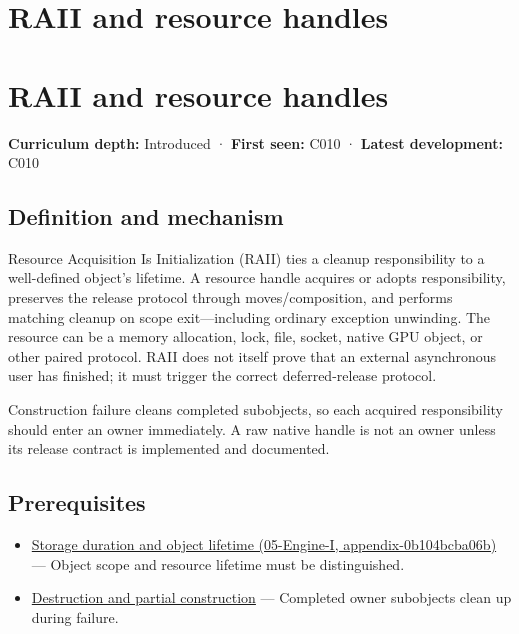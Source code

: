 \hypertarget{appendix-69739d3ab49b}{}
\section*{RAII and resource handles}
\section{RAII and resource handles}\label{appendix-69739d3ab49b-raii-and-resource-handles}

\textbf{Curriculum depth:} Introduced · \textbf{First seen:} C010 · \textbf{Latest development:} C010

\subsection{Definition and mechanism}\label{appendix-69739d3ab49b-definition-and-mechanism}

Resource Acquisition Is Initialization (RAII) ties a cleanup responsibility to a well-defined object's lifetime. A resource handle acquires or adopts responsibility, preserves the release protocol through moves/composition, and performs matching cleanup on scope exit---including ordinary exception unwinding. The resource can be a memory allocation, lock, file, socket, native GPU object, or other paired protocol. RAII does not itself prove that an external asynchronous user has finished; it must trigger the correct deferred-release protocol.

Construction failure cleans completed subobjects, so each acquired responsibility should enter an owner immediately. A raw native handle is not an owner unless its release contract is implemented and documented.

\subsection{Prerequisites}\label{appendix-69739d3ab49b-prerequisites}

\begin{itemize}
\tightlist
\item
  \href{../05-Engine-I/main.pdf\#nameddest=appendix-0b104bcba06b}{Storage duration and object lifetime (05-Engine-I, appendix-0b104bcba06b)} --- Object scope and resource lifetime must be distinguished.
\item
  \hyperref[appendix-9bfe377cef7a]{Destruction and partial construction} --- Completed owner subobjects clean up during failure.
\end{itemize}

